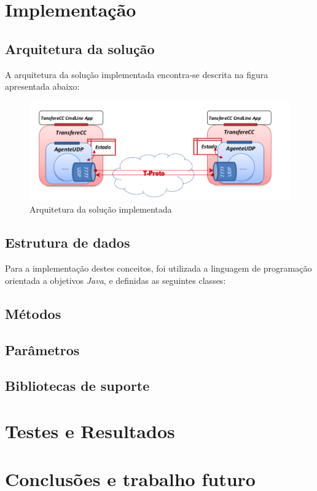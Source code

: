 \documentclass{article}
\begin{document}
\newpage

\section{Implementação}

\subsection{Arquitetura da solução}

A arquitetura da solução implementada encontra-se descrita na figura apresentada abaixo:

\begin{figure}[H]
    \centering
    \includegraphics[scale=0.4]{img/arquitetura.PNG}
    \caption{Arquitetura da solução implementada}
\end{figure}


\subsection{Estrutura de dados}

Para a implementação destes conceitos, foi utilizada a linguagem de programação orientada a objetivos \emph{Java}, e definidas as seguintes classes:


\subsection{Métodos}


\subsection{Parâmetros}


\subsection{Bibliotecas de suporte}


\newpage
\section{Testes e Resultados}


\newpage
\section{Conclusões e trabalho futuro}
\end{document}
